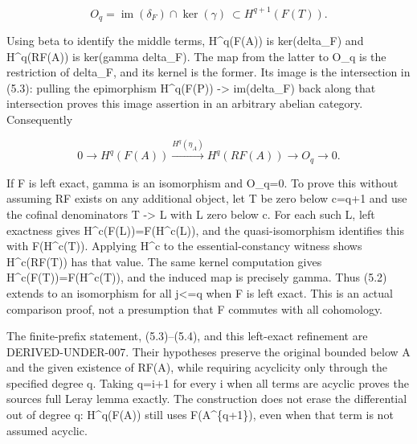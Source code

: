 \documentclass[11pt]{article}
\begin{document}
\[
 O_q=\operatorname{im}(\delta_F)\cap\ker(\gamma)
                  \ \subset H^{q+1}(F(T)).                    \tag{5.3}
\]

Using beta to identify the middle terms,\allowbreak{} H\textasciicircum{}q(F(A)\allowbreak{})\allowbreak{} is ker(delta\_\allowbreak{}F)\allowbreak{} and H\textasciicircum{}q(RF(A)\allowbreak{})\allowbreak{} is ker(gamma delta\_\allowbreak{}F)\allowbreak{}. The map from the latter to O\_\allowbreak{}q is the restriction of delta\_\allowbreak{}F,\allowbreak{} and its kernel is the former. Its image is the intersection in (5.3)\allowbreak{}:\allowbreak{} pulling the epimorphism H\textasciicircum{}q(F(P)\allowbreak{})\allowbreak{} \allowbreak{}-> im(delta\_\allowbreak{}F)\allowbreak{} back along that intersection proves this image assertion in an arbitrary abelian category. Consequently

\[
0\to H^q(F(A))\xrightarrow{H^q(\eta_A)}H^q(RF(A))
                                      \longrightarrow O_q\to0.\tag{5.4}
\]

If F is left exact,\allowbreak{} gamma is an isomorphism and O\_\allowbreak{}q\allowbreak{}=0. To prove this without assuming RF exists on any additional object,\allowbreak{} let T be zero below c\allowbreak{}=q\allowbreak{}+1 and use the cofinal denominators T \allowbreak{}-> L with L zero below c. For each such L,\allowbreak{} left exactness gives H\textasciicircum{}c(F(L)\allowbreak{})\allowbreak{}\allowbreak{}=F(H\textasciicircum{}c(L)\allowbreak{})\allowbreak{},\allowbreak{} and the quasi-isomorphism identifies this with F(H\textasciicircum{}c(T)\allowbreak{})\allowbreak{}. Applying H\^{}c to the essential-constancy witness shows H\textasciicircum{}c(RF(T)\allowbreak{})\allowbreak{} has that value. The same kernel computation gives H\textasciicircum{}c(F(T)\allowbreak{})\allowbreak{}\allowbreak{}=F(H\textasciicircum{}c(T)\allowbreak{})\allowbreak{},\allowbreak{} and the induced map is precisely gamma. Thus (5.2)\allowbreak{} extends to an isomorphism for all j<\allowbreak{}=q when F is left exact. This is an actual comparison proof,\allowbreak{} not a presumption that F commutes with all cohomology.

The finite-prefix statement,\allowbreak{} (5.3)\allowbreak{}–\allowbreak{}(5.4)\allowbreak{},\allowbreak{} and this left-exact refinement are DERIVED-UNDER-007. Their hypotheses preserve the original bounded below A and the given existence of RF(A)\allowbreak{},\allowbreak{} while requiring acyclicity only through the specified degree q. Taking q\allowbreak{}=i\allowbreak{}+1 for every i when all terms are acyclic proves the source\textquotesingle s full Leray lemma exactly. The construction does not erase the differential out of degree q:\allowbreak{} H\textasciicircum{}q(F(A)\allowbreak{})\allowbreak{} still uses F(A\textasciicircum{}\{q\allowbreak{}+1\})\allowbreak{},\allowbreak{} even when that term is not assumed acyclic.
\end{document}
